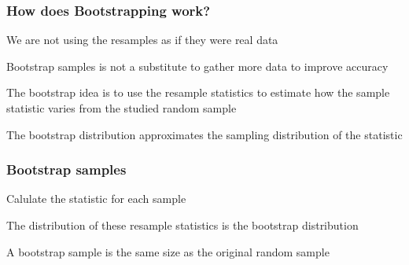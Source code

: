 \documentclass[12pt]{beamer}\usepackage[]{graphicx}\usepackage[]{color}
\makeatletter
\newcommand{\hlnum}[1]{\textcolor[rgb]{0.686,0.059,0.569}{#1}}%
\newcommand{\hlstr}[1]{\textcolor[rgb]{0.192,0.494,0.8}{#1}}%
\newcommand{\hlcom}[1]{\textcolor[rgb]{0.678,0.584,0.686}{\textit{#1}}}%
\newcommand{\hlopt}[1]{\textcolor[rgb]{0,0,0}{#1}}%
\newcommand{\hlstd}[1]{\textcolor[rgb]{0.345,0.345,0.345}{#1}}%
\newcommand{\hlkwb}[1]{\textcolor[rgb]{0.69,0.353,0.396}{#1}}%
\newcommand{\hlkwc}[1]{\textcolor[rgb]{0.333,0.667,0.333}{#1}}%
\newcommand{\hlkwd}[1]{\textcolor[rgb]{0.737,0.353,0.396}{\textbf{#1}}}%
\newenvironment{kframe}{%
 \def\at@end@of@kframe{}%
 \ifinner\ifhmode%
  \def\at@end@of@kframe{\end{minipage}}%
  \begin{minipage}{\columnwidth}%
 \fi\fi%
 \def\FrameCommand##1{\hskip\@totalleftmargin \hskip-\fboxsep
 \colorbox{shadecolor}{##1}\hskip-\fboxsep
     \hskip-\linewidth \hskip-\@totalleftmargin \hskip\columnwidth}%
 \MakeFramed {\advance\hsize-\width
   \@totalleftmargin\z@ \linewidth\hsize
   \@setminipage}}%
 {\par\unskip\endMakeFramed%
 \at@end@of@kframe}
\newenvironment{knitrout}{}{} %
\makeatother
\begin{document}

\begin{frame}
\frametitle{How does Bootstrapping work?}

\bbi
  \item We are not using the resamples as if they were real data
  \item Bootstrap samples is not a substitute to gather more data to improve accuracy
  \item The bootstrap idea is to use the resample statistics to estimate how the sample statistic varies from the studied random sample
  \item The bootstrap distribution approximates the sampling distribution of the statistic
\ei

\end{frame}


\begin{frame}
\frametitle{Bootstrap samples}

\bbi
  \item Calulate the statistic for each sample
  \item The distribution of these resample statistics is the bootstrap distribution
  \item A bootstrap sample is the same size as the original random sample
\ei
\eb

\end{frame}


\begin{frame}
\begin{center}
\Huge{}
\end{center}
\end{frame}


\end{document}
